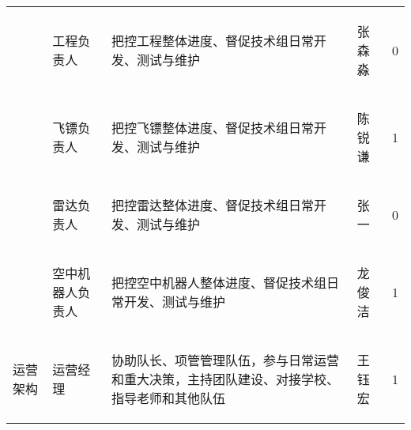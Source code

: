 \begin{longtable}{X | X | X | X | X}
        &
        \begin{center}
            工程负责人
        \end{center} &
        把控工程整体进度、督促技术组日常开发、测试与维护 &
        \begin{center}
            张森淼
        \end{center}&
        \begin{center}
            0
        \end{center}\\

    \cline{2-5}

        &
        \begin{center}
            飞镖负责人
        \end{center} &
        把控飞镖整体进度、督促技术组日常开发、测试与维护 &
        \begin{center}
            陈锐谦
        \end{center}&
        \begin{center}
            1
        \end{center}\\

    \cline{2-5}

        &
        \begin{center}
            雷达负责人
        \end{center} &
        把控雷达整体进度、督促技术组日常开发、测试与维护 &
        \begin{center}
            张一
        \end{center}&
        \begin{center}
            0
        \end{center}\\

    \cline{2-5}

        &
        \begin{center}
            空中机器人负责人
        \end{center}&
        把控空中机器人整体进度、督促技术组日常开发、测试与维护 &
        \begin{center}
            龙俊洁
        \end{center}&
        \begin{center}
            1
        \end{center}\\

    \hline

        \multirow{4}{*}{运营架构} &
        \begin{center}
            运营经理
        \end{center} &
        协助队长、项管管理队伍，参与日常运营和重大决策，主持团队建设、对接学校、指导老师和其他队伍 &
        \begin{center}
            王钰宏
        \end{center}&
        \begin{center}
            1
        \end{center}\\


\end{longtable}
